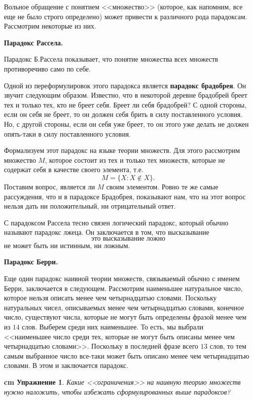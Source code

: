 \documentclass[12pt, russian]{article}
\newtheorem{exercise}{\hskip 0.5 cm Упражнение}%
\begin{document}
Вольное обращение с понятием <<множество>> (которое, как напомним, все еще не было строго определено) может привести к различного рода парадоксам. Рассмотрим некоторые из них.

\textbf{Парадокс Рассела.}

Парадокс Б.Рассела показывает, что понятие множества всех множеств противоречиво само по себе.

Одной из переформулировок этого парадокса является \textbf{парадокс брадобрея}. Он звучит следующим образом. Известно, что в некоторой деревне брадобрей бреет тех и только тех, кто не бреет себя. Бреет ли себя брадобрей? С одной стороны, если он себя не бреет, то он должен себя брить в силу поставленного условия. Но, с другой стороны, если он себя уже бреет, то он этого уже делать не должен опять-таки в силу поставленного условия.

Формализуем этот парадокс на языке теории множеств. Для этого рассмотрим множество $M$, которое состоит из тех и только тех множеств, которые не содержат себя в качестве своего элемента, т.е.
\begin{equation}\label{eqRusselParadox}
	M = \{ X: X \notin X\}.
\end{equation}
Поставим вопрос, является ли $M$ своим элементом. Ровно те же самые рассуждения, что и в парадоксе Брадобрея, показывают нам, что на этот вопрос нельзя дать ни положительный, ни отрицательный ответ.

С  парадоксом Рассела тесно связен логический парадокс, который обычно называют парадокс лжеца. Он заключается в том, что высказывание
$$
\text{это высказывание ложно}
$$
не может быть ни истинным, ни ложным.

\textbf{Парадокс Берри.}

Еще один парадокс наивной теории множеств, связываемый обычно с именем Берри, заключается в следующем. Рассмотрим 
наименьшее натуральное число, которое нельзя описать менее чем четырнадцатью словами. Поскольку натуральных чисел, описываемых менее чем четырнадцатью словами, конечное число, существуют числа, которые не могут быть определены фразой менее чем из $14$ слов. Выберем среди них наименьшее. То есть, мы выбрали <<наименьшее число среди тех, которые не могут быть описаны менее чем четырнадцатью словами>>. Поскольку в последней фразе всего $13$ слов, то тем самым выбранное число все-таки может быть описано менее чем четырнадцатью словами. В этом и заключается парадокс.

\begin{exercise}
	Какие <<ограничения>> на наивную теорию множеств нужно наложить, чтобы избежать сформулированных выше парадоксов?
\end{exercise}
\end{document}
